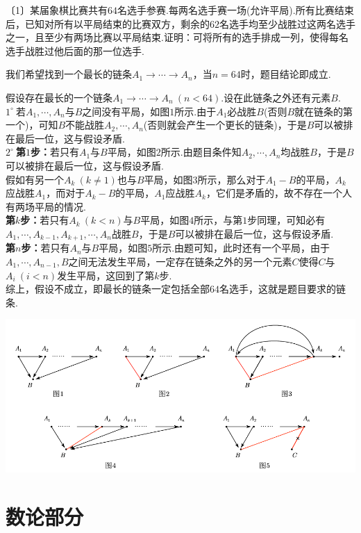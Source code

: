 \documentclass[lang=cn, zihao=4.5]{elegantbook}
\newcommand{\nd}[1]{〔#1〕}
\newcommand{\buzhou}[1]{$#1^{\circ} \ $}
\begin{document}
\begin{example} %
	\nd{1}某届象棋比赛共有$64$名选手参赛.每两名选手赛一场(允许平局).所有比赛结束后，已知对所有以平局结束的比赛双方，剩余的$62$名选手均至少战胜过这两名选手之一，且至少有两场比赛以平局结束.证明：可将所有的选手排成一列，使得每名选手战胜过他后面的那一位选手.
\end{example}
\begin{solution}
	\begin{guess}
		我们希望找到一个最长的链条$A_1 \to \cdots \to A_n$，当$n=64$时，题目结论即成立.
	\end{guess}
	假设存在最长的一个链条$A_1 \to \cdots \to A_n~(n < 64)$.设在此链条之外还有元素$B$. \\
	\buzhou{1}若$A_1, \cdots ,A_n$与$B$之间没有平局，如图$1$所示.由于$A_1$必战胜$B$(否则$B$就在链条的第一个)，可知$B$不能战胜$A_2, \cdots ,A_n$(否则就会产生一个更长的链条)，于是$B$可以被排在最后一位，这与假设矛盾. \\
	\buzhou{2}\textbf{第$1$步：}若只有$A_1$与$B$平局，如图$2$所示.由题目条件知$A_2, \cdots ,A_n$均战胜$B$，于是$B$可以被排在最后一位，这与假设矛盾. \\
	假如有另一个$A_k~(k \neq 1)$也与$B$平局，如图$3$所示，那么对于$A_1-B$的平局，$A_k$应战胜$A_1$，而对于$A_k-B$的平局，$A_1$应战胜$A_k$，它们是矛盾的，故不存在一个人有两场平局的情况. \\
	\textbf{第$k$步：}若只有$A_k~(k<n)$与$B$平局，如图$4$所示，与第$1$步同理，可知必有$A_1, \cdots ,A_{k-1},A_{k+1}, \cdots ,A_n$战胜$B$，于是$B$可以被排在最后一位，这与假设矛盾. \\
	\textbf{第$n$步：}若只有$A_n$与$B$平局，如图$5$所示.由题可知，此时还有一个平局，由于$A_1, \cdots ,A_{n-1},B$之间无法发生平局，一定存在链条之外的另一个元素$C$使得$C$与$A_i~(i<n)$发生平局，这回到了第$k$步. \\
	综上，假设不成立，即最长的链条一定包括全部$64$名选手，这就是题目要求的链条.
	\begin{center}
		\includegraphics[width=16cm]{attachment/202302074.pdf}
	\end{center}
\end{solution}

\part{数论部分}
\end{document}
